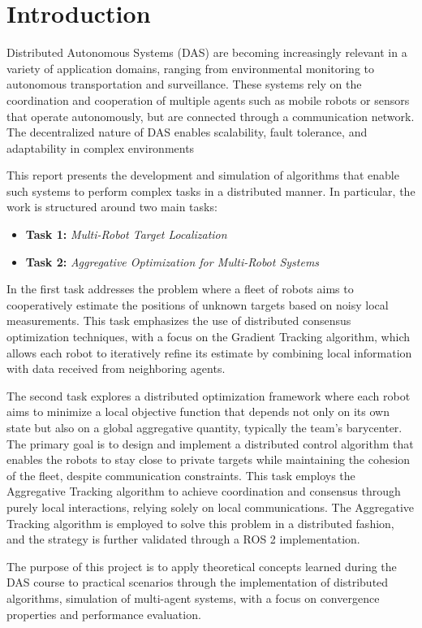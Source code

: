 \chapter{Introduction}

Distributed Autonomous Systems (DAS) are becoming increasingly relevant in a variety of application domains, ranging from environmental 
monitoring to autonomous transportation and surveillance. These systems rely on the coordination and cooperation of multiple agents such as
mobile robots or sensors that operate autonomously, but are connected through a communication network. The decentralized nature of DAS enables 
scalability, fault tolerance, and adaptability in complex environments


\noindent
This report presents the development and simulation of algorithms that enable such systems to perform complex tasks in a distributed manner. 
In particular, the work is structured around two main tasks: 
\begin{itemize}
    \item \textbf{Task 1:} \textit{Multi-Robot Target Localization}
    \item \textbf{Task 2:} \textit{Aggregative Optimization for Multi-Robot Systems}
\end{itemize}

\noindent In the first task addresses the problem where a fleet of robots aims to cooperatively estimate the positions of unknown targets based on
noisy local measurements. This task emphasizes the use of distributed consensus optimization techniques, with a focus on the Gradient Tracking 
algorithm, which allows each robot to iteratively refine its estimate by combining local information with data received from neighboring agents.


\noindent The second task explores a distributed optimization framework where each robot aims to minimize a local objective function 
that depends not only on its own state but also on a global aggregative quantity, typically the team's barycenter. 
The primary goal is to design and implement a distributed control algorithm that enables the robots to stay close to private targets while 
maintaining the cohesion of the fleet, despite communication constraints. This task employs the Aggregative Tracking algorithm to achieve 
coordination and consensus through purely local interactions, relying solely on local communications. The Aggregative Tracking algorithm is 
employed to solve this problem in a distributed fashion, and the strategy is further validated through a ROS 2 implementation.


The purpose of this project is to apply theoretical concepts learned during the DAS course to practical scenarios through the implementation of 
distributed algorithms, simulation of multi-agent systems, with a focus on convergence properties and performance evaluation.